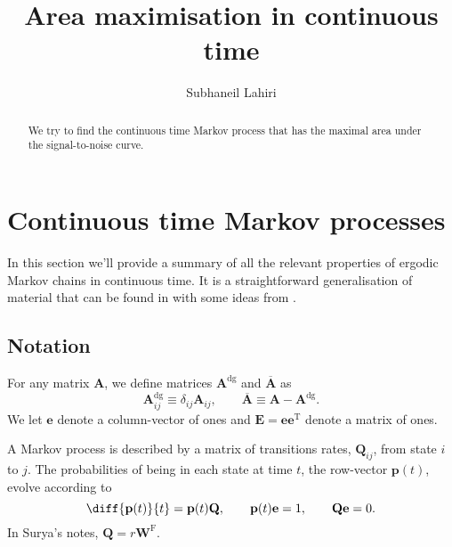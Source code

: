 \documentclass[12pt]{article}
\title{Area maximisation in continuous time}
\author{Subhaneil Lahiri
%
}
\newcommand{\dg}{^\mathrm{dg}}
\newcommand{\trans}{^\mathrm{T}}
\newcommand{\onev}{\mathbf{e}}
\newcommand{\onem}{\mathbf{E}}
\newcommand{\MM}{\mathbf{Q}}
\newcommand{\W}{\mathbf{W}}
\newcommand{\frg}{\W^{\mathrm{F}}}
\begin{document}
\maketitle




\begin{abstract}
  We try to find the continuous time Markov process that has the maximal area under the signal-to-noise curve.
\end{abstract}

\tableofcontents


\section{Continuous time Markov processes}\label{sec:ContMarkov}

In this section we'll provide a summary of all the relevant properties of ergodic Markov chains in continuous time.
It is a straightforward generalisation of material that can be found in \cite{kemeny1960finite} with some ideas from \cite{hunter2000survey}.


\subsection{Notation}\label{sec:not}

For any matrix $\mathbf{A}$, we define matrices $\mathbf{A}\dg$ and $\overline{\mathbf{A}}$ as
%
\begin{equation}\label{eq:dgdef}
  \mathbf{A}\dg_{ij} \equiv \delta_{ij}\mathbf{A}_{ij},
  \qquad
  \overline{\mathbf{A}} \equiv \mathbf{A}-\mathbf{A}\dg.
\end{equation}
%
We let $\onev$ denote a column-vector of ones and $\onem=\onev\onev\trans$ denote a matrix of ones.


A Markov process is described by a matrix of transitions rates, $\MM_{ij}$, from state $i$ to $j$.
The probabilities of being in each state at time $t$, the row-vector $\mathbf{p}(t)$, evolve according to
%
\begin{equation}\label{eq:rowsum}
  \diff{\mathbf{p}(t)}{t} = \mathbf{p}(t) \MM,
  \qquad
  \mathbf{p}(t)\onev=1,
  \qquad
  \MM\onev=0.
\end{equation}
%
In Surya's notes, $\MM=r\frg$.
\end{document}
